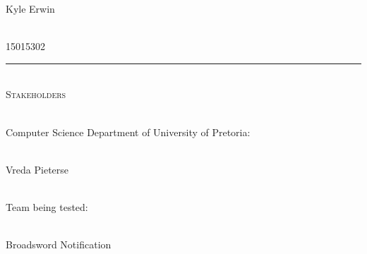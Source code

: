 \begin{titlepage}
\begin{center}
		\begin{minipage}{0.5\textwidth}
			\begin{flushleft} \large
				Kyle {Erwin}
			\end{flushleft}
		\end{minipage}
		\begin{minipage}{0.4\textwidth}
			\begin{flushright} \large
				\emph{} \\
				15015302 
			\end{flushright}
		\end{minipage}
		
		\rule{\linewidth}{0.5mm} \\[1cm] 
		\textsc{\Large Stakeholders}\\[1cm]	
		
		\begin{minipage}{0.4\textwidth}
			\begin{flushleft} \large
				\emph{} \\
				Computer Science Department of University of Pretoria:
			\end{flushleft}
		\end{minipage}
		\begin{minipage}{0.4\textwidth}
			\begin{flushright} \large
				\emph{} \\
				Vreda Pieterse
			\end{flushright}
		\end{minipage}
		\begin{minipage}{0.4\textwidth}
			\begin{flushleft} \large
				\emph{} \\
				Team being tested:
			\end{flushleft}
		\end{minipage}
		\begin{minipage}{0.4\textwidth}
			\begin{flushright} \large
				\emph{} \\
				Broadsword Notification
			\end{flushright}
		\end{minipage}
		
	\end{center}
\end{titlepage}